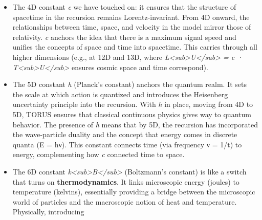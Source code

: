 \documentclass[]{article}
\begin{document}
{\begin{itemize}
  \emph{G} are solved together to fit with the lower dimensions. The
  physical meaning is that at the 3D scale, a single particle's gravity
  is as strong as its quantum effects -- an anchor point where our usual
  separation of ``quantum vs gravity'' breaks down. TORUS takes the
  observed gravitational constant and shows it indeed yields a Planck
<<<<<<< HEAD
  mass of \textasciitilde2×10\^{}-8 kg, which matches this required
=======
  mass of \textasciitilde{}2×10\^{}-8 kg, which matches this required
>>>>>>> 4f5eaae (Fix: robust Unicode/maths in LaTeX and explicit push to main in workflow)
  balance. The fact that nature's actual \emph{G} produces the expected
  m\textless{}sub\textgreater{}P\textless{}/sub\textgreater{} is a
  strong consistency check for TORUS​ -- it means the ``anchor'' was
  placed correctly.
\item
  The 4D constant \emph{c} we have touched on: it ensures that the
  structure of spacetime in the recursion remains Lorentz-invariant.
  From 4D onward, the relationships between time, space, and velocity in
  the model mirror those of relativity. \emph{c} anchors the idea that
  there is a maximum signal speed and unifies the concepts of space and
  time into spacetime. This carries through all higher dimensions (e.g.,
  at 12D and 13D, where
  \emph{L\textless{}sub\textgreater{}U\textless{}/sub\textgreater{} = c
  · T\textless{}sub\textgreater{}U\textless{}/sub\textgreater{}} ensures
  cosmic space and time correspond​).
\item
  The 5D constant \emph{h} (Planck's constant) anchors the quantum
  realm. It sets the scale at which action is quantized and introduces
  the Heisenberg uncertainty principle into the recursion. With \emph{h}
  in place, moving from 4D to 5D, TORUS ensures that classical
  continuous physics gives way to quantum behavior. The presence of
  \emph{h} means that by 5D, the recursion has incorporated the
  wave-particle duality and the concept that energy comes in discrete
  quanta (E = hν). This constant connects time (via frequency ν = 1/t)
  to energy, complementing how \emph{c} connected time to space.
\item
  The 6D constant
  \emph{k\textless{}sub\textgreater{}B\textless{}/sub\textgreater{}}
  (Boltzmann's constant) is like a switch that turns on
  \textbf{thermodynamics}. It links microscopic energy (joules) to
  temperature (kelvins), essentially providing a bridge between the
  microscopic world of particles and the macroscopic notion of heat and
  temperature. Physically, introducing

\end{itemize}}
\end{document}

